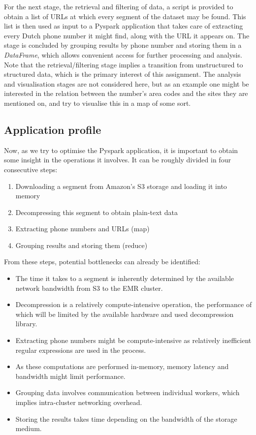 \documentclass{article}
\begin{document}
For the next stage, the retrieval and filtering of data, a script is provided to obtain a list of URLs at which every segment of the dataset may be found.
This list is then used as input to a Pyspark application that takes care of extracting every Dutch phone number it might find, along with the URL it appears on.
The stage is concluded by grouping results by phone number and storing them in a \emph{DataFrame}, which allows convenient access for further processing and analysis.
Note that the retrieval/filtering stage implies a transition from unstructured to structured data, which is the primary interest of this assignment.
The analysis and visualisation stages are not considered here, but as an example one might be interested in the relation between the number's area codes and the sites they are mentioned on, and try to visualise this in a map of some sort.

\subsection{Application profile}

Now, as we try to optimise the Pyspark application, it is important to obtain some insight in the operations it involves.
It can be roughly divided in four consecutive steps:

\begin{enumerate}
	\item Downloading a segment from Amazon's S3 storage and loading it into memory
	\item Decompressing this segment to obtain plain-text data
	\item Extracting phone numbers and URLs (map)
	\item Grouping results and storing them (reduce)
\end{enumerate}

From these steps, potential bottlenecks can already be identified:

\begin{itemize}

	\item The time it takes to a segment is inherently determined by the available network bandwidth from S3 to the EMR cluster.
	\item Decompression is a relatively compute-intensive operation, the performance of which will be limited by the available hardware and used decompression library.
	\item Extracting phone numbers might be compute-intensive as relatively inefficient regular expressions are used in the process.
	\item As these computations are performed in-memory, memory latency and bandwidth might limit performance.
	\item Grouping data involves communication between individual workers, which implies intra-cluster networking overhead.
	\item Storing the results takes time depending on the bandwidth of the storage medium.
\end{itemize}
\end{document}
